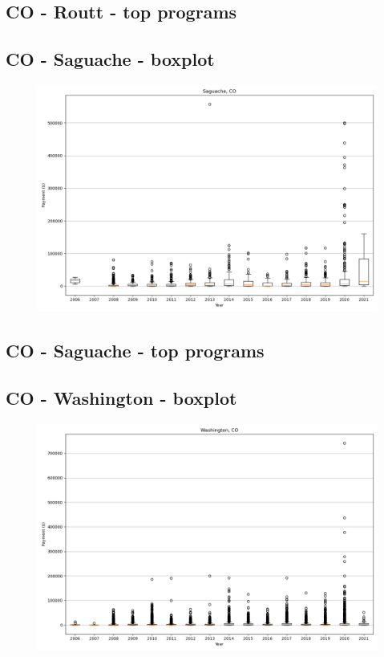 \subsection*{CO - Routt - top programs}

\newpage
\subsection*{CO - Saguache - boxplot}
\begin{figure}[h]
\centering
\includegraphics[width=7in]{../output/boxplots/counties/Saguache-CO_boxplot.png}
\end{figure}


\subsection*{CO - Saguache - top programs}

\newpage
\subsection*{CO - Washington - boxplot}
\begin{figure}[h]
\centering
\includegraphics[width=7in]{../output/boxplots/counties/Washington-CO_boxplot.png}
\end{figure}


